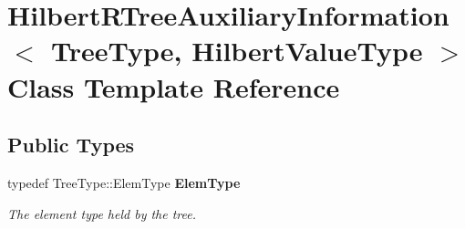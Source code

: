\section{Hilbert\+R\+Tree\+Auxiliary\+Information$<$ Tree\+Type, Hilbert\+Value\+Type $>$ Class Template Reference}
\label{classmlpack_1_1tree_1_1HilbertRTreeAuxiliaryInformation}
\subsection*{Public Types}
\begin{DoxyCompactItemize}
\item 
typedef Tree\+Type\+::\+Elem\+Type \textbf{ Elem\+Type}
\begin{DoxyCompactList}\small\item\em The element type held by the tree. \end{DoxyCompactList}\end{DoxyCompactItemize}
